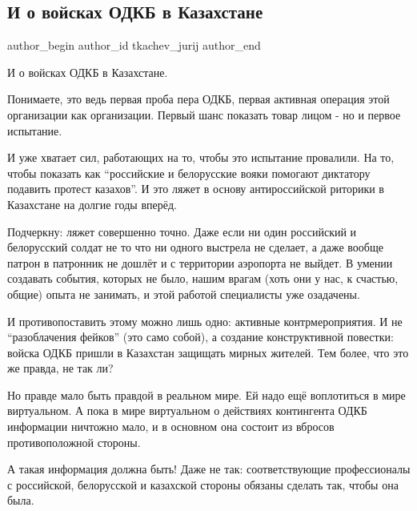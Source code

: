  
 
 
 
 
\subsection{И о войсках ОДКБ в Казахстане}
\label{sec:08_01_2022.tg.tkachev_jurij.1.odkb_kazahstan}

\ifcmt
 author_begin
   author_id tkachev_jurij
 author_end
\fi

И о войсках ОДКБ в Казахстане.

Понимаете, это ведь первая проба пера ОДКБ, первая активная операция этой
организации как организации. Первый шанс показать товар лицом - но и первое
испытание.

И уже хватает сил, работающих на то, чтобы это испытание провалили. На то,
чтобы показать как \enquote{российские и белорусские вояки помогают диктатору подавить
протест казахов}. И это ляжет в основу антироссийской риторики в Казахстане на
долгие годы вперёд. 

Подчеркну: ляжет совершенно точно. Даже если ни один российский и белорусский
солдат не то что ни одного выстрела не сделает, а даже вообще патрон в
патронник не дошлёт и с территории аэропорта не выйдет. В умении создавать
события, которых не было, нашим врагам (хоть они у нас, к счастью, общие) опыта
не занимать, и этой работой специалисты уже озадачены.

И противопоставить этому можно лишь одно: активные контрмероприятия. И не
\enquote{разоблачения фейков} (это само собой), а создание конструктивной повестки:
войска ОДКБ пришли в Казахстан  защищать мирных жителей. Тем более, что это же
правда, не так ли? 

Но правде мало быть правдой в реальном мире. Ей надо ещё воплотиться в мире
виртуальном. А пока в мире виртуальном о действиях контингента ОДКБ информации
ничтожно мало, и в основном она состоит из вбросов противоположной стороны.

А такая информация должна быть! Даже не так: соответствующие профессионалы с
российской, белорусской и казахской стороны обязаны сделать так, чтобы она
была.


